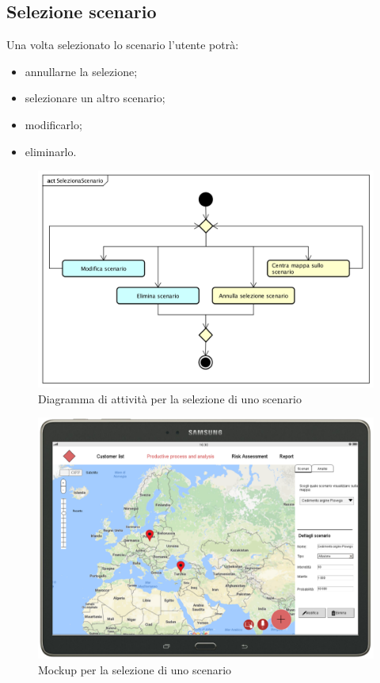 \subsection{Selezione scenario}
Una volta selezionato lo scenario l'utente potrà:
\begin{itemize}
	\item annullarne la selezione;
	\item selezionare un altro scenario;
	\item modificarlo;
	\item eliminarlo.
\end{itemize}
\begin{figure}[H]
	\centering
	\includegraphics[width=\textwidth]{img/DiagrammiDiAttivita/SelezioneScenario.png}
	\caption{Diagramma di attività per la selezione di uno scenario}
\end{figure}
\begin{figure}[H]
	\centering
	\includegraphics[width=\textwidth]{img/MockUp/m1.png}
	\caption{Mockup per la selezione di uno scenario}
\end{figure}

